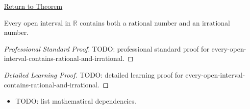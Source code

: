 \newpage
{}
\label{prf:every-open-interval-contains-rational-and-irrational}

\begin{remark*}[Return]
\hyperref[cor:every-open-interval-contains-rational-and-irrational]{Return to Theorem}
\end{remark*}

\begin{theorem*}
Every open interval in $\mathbb{R}$ contains both a rational number and an irrational number.
\end{theorem*}

\begin{proof}[Professional Standard Proof]
\LRAProofBodyStart
TODO: professional standard proof for every-open-interval-contains-rational-and-irrational.
\end{proof}

\begin{proof}[Detailed Learning Proof]
\LRAProofBodyStart
TODO: detailed learning proof for every-open-interval-contains-rational-and-irrational.
\end{proof}

\begin{remark*}
\end{remark*}

\begin{dependencies}
\begin{itemize}
  \item TODO: list mathematical dependencies.
\end{itemize}
\end{dependencies}

\clearpage
